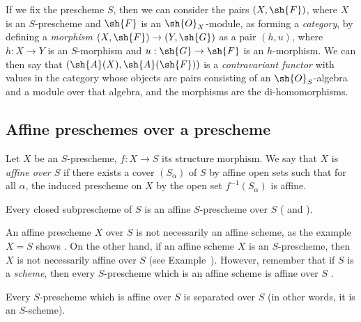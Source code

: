 \begin{env}[1.1.3]
\label{2.1.1.3}
If we fix the prescheme $S$, then we can consider the pairs $(X,\sh{F})$, where $X$ is an $S$-prescheme and $\sh{F}$ is an $\sh{O}_X$-module, as forming a \emph{category}, by defining a \emph{morphism} $(X,\sh{F})\to(Y,\sh{G})$ as a pair $(h,u)$, where $h:X\to Y$ is an $S$-morphism and $u:\sh{G}\to\sh{F}$ is an $h$-morphism.
We can then say that $(\sh{A}(X),\sh{A}(\sh{F}))$ is a \emph{contravariant functor} with values in the category whose objects are pairs consisting of an $\sh{O}_S$-algebra and a module over that algebra, and the morphisms are the di-homomorphisms.
\end{env}

\subsection{Affine preschemes over a prescheme}
\label{subsection:2.1.2}

\begin{definition}[1.2.1]
\label{2.1.2.1}
Let $X$ be an $S$-prescheme, $f:X\to S$ its structure morphism.
We say that $X$ is \emph{affine over $S$} if there exists a cover $(S_\alpha)$ of $S$ by affine open sets such that for all $\alpha$, the induced prescheme on $X$ by the open set $f^{-1}(S_\alpha)$ is affine.
\end{definition}

\begin{example}[1.2.2]
\label{2.1.2.2}
Every closed subprescheme of $S$ is an affine $S$-prescheme over $S$ ( and ).
\end{example}

\begin{remark}[1.2.3]
\label{2.1.2.3}
An affine prescheme $X$ over $S$ is not necessarily an affine scheme, as the example $X=S$ shows .
On the other hand, if an affine scheme $X$ is an $S$-prescheme, then $X$ is not necessarily affine over
$S$ (see Example~).
However, remember that if $S$ is a \emph{scheme}, then every $S$-prescheme which is an affine scheme is affine over $S$ .
\end{remark}

\begin{proposition}[1.2.4]
\label{2.1.2.4}
Every $S$-prescheme which is affine over $S$ is separated over $S$ (in other words, it is an $S$-scheme).
\end{proposition}

